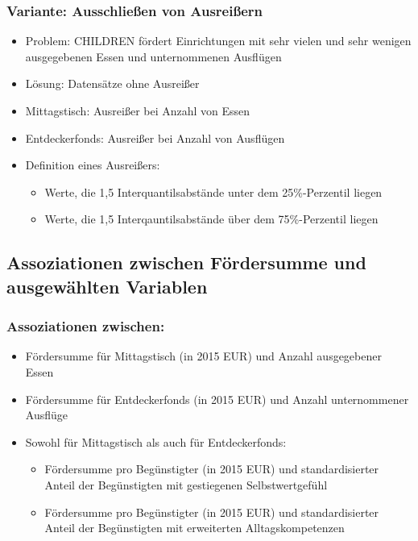 \begin{frame}[fragile]
\frametitle{Variante: Ausschließen von Ausreißern}
\begin{itemize}
\item Problem: CHILDREN fördert Einrichtungen mit sehr vielen und sehr wenigen ausgegebenen Essen und unternommenen Ausflügen
\item Lösung: Datensätze ohne Ausreißer
\item Mittagstisch: Ausreißer bei Anzahl von Essen
\item Entdeckerfonds: Ausreißer bei Anzahl von Ausflügen
\item Definition eines Ausreißers:
\begin{itemize}
\item Werte, die 1,5 Interquantilsabstände unter dem 25\%-Perzentil liegen
\item Werte, die 1,5 Interqauntilsabstände über dem 75\%-Perzentil liegen
\end{itemize}
\end{itemize}
\end{frame}

\subsection{Assoziationen zwischen Fördersumme und ausgewählten Variablen}

\begin{frame}[fragile]
\frametitle{Assoziationen zwischen:}
\begin{itemize}
\item Fördersumme für Mittagstisch (in 2015 EUR) und Anzahl ausgegebener Essen
\item Fördersumme für Entdeckerfonds (in 2015 EUR) und Anzahl unternommener Ausflüge
\item Sowohl für Mittagstisch als auch für Entdeckerfonds:
\begin{itemize}
\item Fördersumme pro Begünstigter (in 2015 EUR) und standardisierter Anteil der Begünstigten mit gestiegenen Selbstwertgefühl
\item Fördersumme pro Begünstigter (in 2015 EUR) und standardisierter Anteil der Begünstigten mit erweiterten Alltagskompetenzen
\end{itemize}
\end{itemize}
\end{frame}


